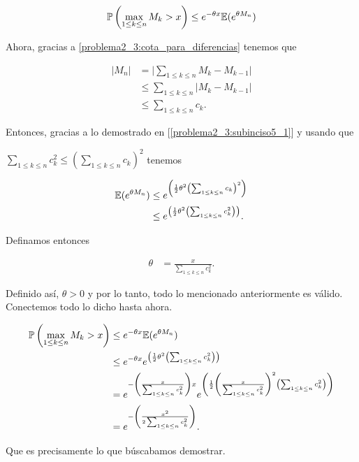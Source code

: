 \begin{align}
    \mathbb{P}\left( \max_{1 \leq k \leq n} M_k > x \right) \leq e^{- \theta x} \mathbb{E}(e^{\theta M_n})
\end{align}\pn

Ahora, gracias a \eqref{problema2_3:cota_para_diferencias} tenemos que

\begin{align}
        |M_n|   &=      \bigg| \sum_{1 \leq k \leq n} M_k - M_{k-1} \bigg|       \\
                &\leq   \sum_{1 \leq k \leq n} \bigg| M_k - M_{k-1} \bigg|       \\
                &\leq   \sum_{1 \leq k \leq n} c_k.                               
\end{align}

Entonces, gracias a lo demostrado en [\ref{problema2_3:subinciso5_1}] y usando que \par$\sum_{1 \leq k \leq n} c_k^2 \leq (\sum_{1 \leq k \leq n} c_k)^2$ tenemos

\begin{align}
    \mathbb{E}(e^{\theta M_n})  &\leq   e^{\left( \frac{1}{2} \theta^2 \left( \sum_{1 \leq k \leq n} c_k \right)^2\right)}  \\
                        &\leq   e^{\left( \frac{1}{2} \theta^2 \left( \sum_{1 \leq k \leq n} c_k^2 \right)\right)}.
\end{align}\pn

Definamos entonces

\begin{align}
    \theta &= \frac{x}{\sum_{1 \leq k \leq n} c_k^2}.
\end{align}\pn

Definido así, $\theta > 0$ y por lo tanto, todo lo mencionado anteriormente es válido. Conectemos todo lo dicho hasta ahora.\pn

\begin{align}
    \mathbb{P}\left( \max_{1 \leq k \leq n} M_k > x \right)    &\leq   e^{- \theta x} \mathbb{E}(e^{\theta M_n})                                                                                                                                                           \\
                                                        &\leq   e^{- \theta x} e^{\left( \frac{1}{2} \theta^2 \left( \sum_{1 \leq k \leq n} c_k^2 \right)\right)}                                                                                           \\
                                                        &=      e^{- \left(\frac{x}{\sum_{1 \leq k \leq n} c_k^2}\right) x} e^{\left( \frac{1}{2} \left(\frac{x}{\sum_{1 \leq k \leq n} c_k^2}\right)^2 \left( \sum_{1 \leq k \leq n} c_k^2 \right)\right)} \\
                                                        &=      e^{- \left(\frac{x^2}{2 \sum_{1 \leq k \leq n} c_k^2}\right)}.
\end{align}\pn

Que es precisamente lo que búscabamos demostrar.

